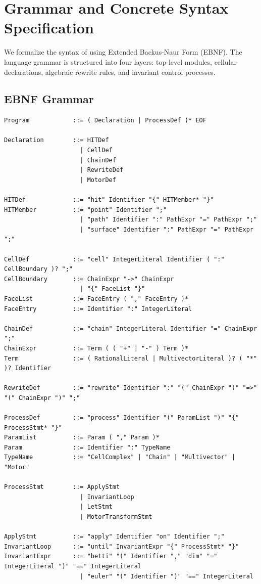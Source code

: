 \section{Grammar and Concrete Syntax Specification}
\label{sec:grammar_syntax}

We formalize the syntax of \ToposLang{} using Extended Backus-Naur Form (EBNF). The language grammar is structured into four layers: top-level modules, cellular declarations, algebraic rewrite rules, and invariant control processes.

\subsection{EBNF Grammar}
\begin{lstlisting}[language={}]
Program            ::= ( Declaration | ProcessDef )* EOF

Declaration        ::= HITDef
                     | CellDef
                     | ChainDef
                     | RewriteDef
                     | MotorDef

HITDef             ::= "hit" Identifier "{" HITMember* "}"
HITMember          ::= "point" Identifier ";"
                     | "path" Identifier ":" PathExpr "=" PathExpr ";"
                     | "surface" Identifier ":" PathExpr "=" PathExpr ";"

CellDef            ::= "cell" IntegerLiteral Identifier ( ":" CellBoundary )? ";"
CellBoundary       ::= ChainExpr "->" ChainExpr
                     | "{" FaceList "}"
FaceList           ::= FaceEntry ( "," FaceEntry )*
FaceEntry          ::= Identifier ":" IntegerLiteral

ChainDef           ::= "chain" IntegerLiteral Identifier "=" ChainExpr ";"
ChainExpr          ::= Term ( ( "+" | "-" ) Term )*
Term               ::= ( RationalLiteral | MultivectorLiteral )? ( "*" )? Identifier

RewriteDef         ::= "rewrite" Identifier ":" "(" ChainExpr ")" "=>" "(" ChainExpr ")" ";"

ProcessDef         ::= "process" Identifier "(" ParamList ")" "{" ProcessStmt* "}"
ParamList          ::= Param ( "," Param )*
Param              ::= Identifier ":" TypeName
TypeName           ::= "CellComplex" | "Chain" | "Multivector" | "Motor"

ProcessStmt        ::= ApplyStmt
                     | InvariantLoop
                     | LetStmt
                     | MotorTransformStmt

ApplyStmt          ::= "apply" Identifier "on" Identifier ";"
InvariantLoop      ::= "until" InvariantExpr "{" ProcessStmt* "}"
InvariantExpr      ::= "betti" "(" Identifier "," "dim" "=" IntegerLiteral ")" "==" IntegerLiteral
                     | "euler" "(" Identifier ")" "==" IntegerLiteral


\end{lstlisting}

